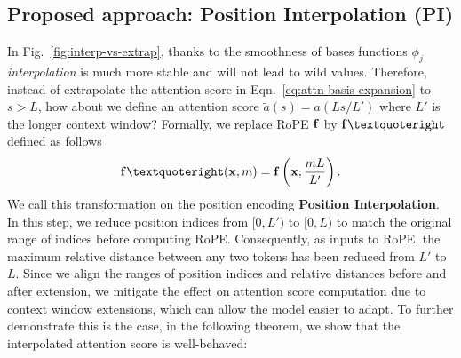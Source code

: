 \documentclass{article} %
\theoremstyle{definition}
\begin{document}
\subsection{Proposed approach: Position Interpolation (PI)} 
In Fig.~\ref{fig:interp-vs-extrap}, thanks to the smoothness of bases functions $\phi_j$
\emph{interpolation} is much more stable and will not lead to wild values. Therefore, instead of extrapolate the attention score in Eqn.~\ref{eq:attn-basis-expansion} to $s > L$, how about we define an attention score $\tilde a(s) = a(Ls/L')$ where $L'$ is the longer context window? Formally, we replace RoPE $\mathbf{f}$ by $\vf’$ defined as follows
\begin{equation}
    \vf’(\vx, m)= \vf\left(\vx, \frac{mL}{L'} \right).
\end{equation}
We call this transformation on the position encoding \textbf{Position Interpolation}. In this step, we reduce position indices from $[0, L')$ to $[0, L)$ to match the original range of indices before computing RoPE. Consequently, as inputs to RoPE, the maximum relative distance between any two tokens has been reduced from $L'$ to $L$. Since we align the ranges of position indices and relative distances before and after extension, we mitigate the effect on attention score computation due to context window extensions, which can allow the model easier to adapt. To further demonstrate this is the case, in the following theorem, we show that the interpolated attention score is well-behaved: 
\end{document}
